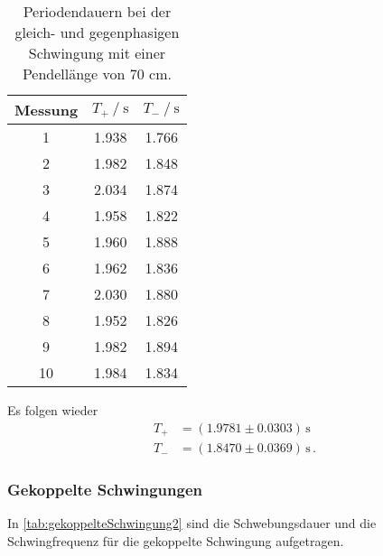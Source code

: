 \begin{table}[H]
  \centering
  \caption{Periodendauern bei der gleich- und gegenphasigen Schwingung mit einer Pendellänge von 70 cm.}
  \label{tab:GleigphaSchwingung2}
  \begin{tabular}{S[table-format=2.0] S S[table-format=1.3] }
    \toprule
    {Messung} & {$T_+ \mathbin{/} \unit{\second}$} & {$T_- \mathbin{/} \unit{\second}$} \\
     & 1.938 & 1.766 \\
    2 & 1.982 & 1.848 \\
    3 & 2.034 & 1.874 \\
    4 & 1.958 & 1.822 \\
    5 & 1.960 & 1.888 \\
    6 & 1.962 & 1.836 \\
    7 & 2.030 & 1.880 \\
    8 & 1.952 & 1.826 \\
    9 & 1.982 & 1.894 \\
   10 & 1.984 & 1.834 \\
    \bottomrule
  \end{tabular}
\end{table}

Es folgen wieder
\begin{align*}
  T_+ &= (1.9781 \pm 0.0303) \, \unit{\second} \\
  T_- &= (1.8470 \pm 0.0369) \, \unit{\second} \,.
\end{align*}

\subsubsection{Gekoppelte Schwingungen}

In \autoref{tab:gekoppelteSchwingung2} sind die Schwebungsdauer und die Schwingfrequenz für die gekoppelte Schwingung aufgetragen.

